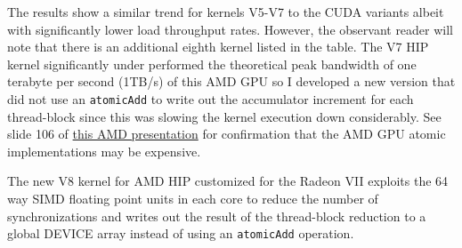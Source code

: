 The results show a similar trend for kernels V5-V7 to the CUDA variants albeit with significantly lower load throughput rates. However, the observant reader will note that there is an additional eighth kernel listed in the table. The V7 HIP kernel significantly under performed the theoretical peak bandwidth of one terabyte per second (1TB/s) of this AMD GPU so I developed a new version that did not use an \texttt{atomicAdd} to write out the accumulator increment for each thread-block since this was slowing the kernel execution down considerably. See slide 106 of \href{https://www.olcf.ornl.gov/wp-content/uploads/2019/09/AMD_GPU_HIP_training_20190906.pdf}{this AMD presentation} for confirmation that the AMD GPU atomic implementations may be expensive.

The new V8 kernel for AMD HIP customized for the Radeon VII exploits the 64 way SIMD floating point units in each core to reduce the number of synchronizations and writes out the result of the thread-block reduction to a global DEVICE array instead of using an \texttt{atomicAdd} operation.

